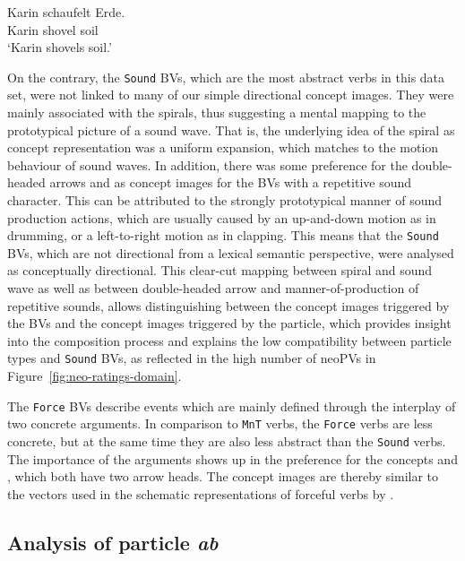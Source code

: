 \documentclass[output=paper]{langsci/langscibook}
\begin{document}
\ea\label{ex:schaufelErde} 
\gll Karin schaufelt Erde.\\ 
Karin shovel soil\\
\glt `Karin shovels soil.'
\z

On the contrary, the \texttt{Sound} BVs, which are the most abstract
verbs in this data set, were not linked to many of our simple
directional concept images. They were mainly associated with the spirals, thus
suggesting a mental mapping to the prototypical picture of a sound
wave. That is, the underlying idea of the spiral as concept
representation was a uniform expansion, which matches to the motion
behaviour of sound waves. In addition, there was some preference for
the double-headed arrows  and  as
concept images for the BVs with a repetitive sound character. This can be
attributed to the strongly prototypical manner of sound production
actions, which are usually caused by an up-and-down motion as in
drumming, or a left-to-right motion as in clapping. This means that
the \texttt{Sound} BVs, which are not directional from a lexical
semantic perspective, were analysed as conceptually directional. This
clear-cut mapping between spiral and sound wave as well as between
double-headed arrow and manner-of-production of repetitive sounds,
allows distinguishing between the concept images triggered by the BVs and the concept images
triggered by the particle, which provides insight into the composition
process and explains the low compatibility between particle types and
\texttt{Sound} BVs, as reflected in the high number of neoPVs in
Figure~\ref{fig:neo-ratings-domain}.

The \texttt{Force} BVs describe events which are mainly defined
through the interplay of two concrete arguments. In comparison to
\texttt{MnT} verbs, the \texttt{Force} verbs are less concrete, but at
the same time they are also less abstract than the \texttt{Sound}
verbs. The importance of the arguments shows up in the preference for
the concepts  and , which both have
two arrow heads. The concept images are thereby similar to the vectors used in
the schematic representations of forceful verbs by \cite{Zwarts:10}.

\subsection{Analysis of particle \textit{ab}}
\label{sec:disc-ab}
\end{document}
